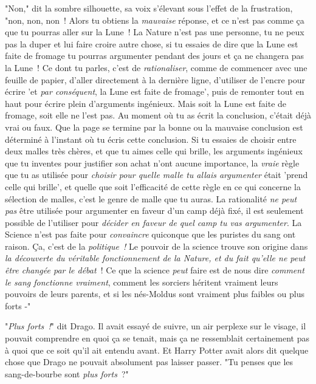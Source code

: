 "Non," dit la sombre silhouette, sa voix s'élevant sous l'effet de la frustration, "non, non, non~! Alors tu obtiens la \emph{mauvaise} réponse, et ce n'est pas comme ça que tu pourras aller sur la Lune~! La Nature n'est pas une personne, tu ne peux pas la duper et lui faire croire autre chose, si tu essaies de dire que la Lune est faite de fromage tu pourras argumenter pendant des jours et ça ne changera pas la Lune~! Ce dont tu parles, c'est de \emph{rationaliser}, comme de commencer avec une feuille de papier, d'aller directement à la dernière ligne, d'utiliser de l'encre pour écrire 'et \emph{par conséquent}, la Lune est faite de fromage', puis de remonter tout en haut pour écrire plein d'arguments ingénieux. Mais soit la Lune est faite de fromage, soit elle ne l'est pas. Au moment où tu as écrit la conclusion, c'était déjà vrai ou faux. Que la page se termine par la bonne ou la mauvaise conclusion est déterminé à l'instant où tu écris cette conclusion. Si tu essaies de choisir entre deux malles très chères, et que tu aimes celle qui brille, les arguments ingénieux que tu inventes pour justifier son achat n'ont aucune importance, la \emph{vraie} règle que tu as utilisée pour \emph{choisir pour quelle malle tu allais argumenter} était 'prend celle qui brille', et quelle que soit l'efficacité de cette règle en ce qui concerne la sélection de malles, c'est le genre de malle que tu auras. La rationalité \emph{ne peut pas} être utilisée pour argumenter en faveur d'un camp déjà fixé, il est seulement possible de l'utiliser pour \emph{décider en faveur de quel camp tu vas argumenter}. La Science n'est pas faite pour \emph{convaincre} quiconque que les puristes du sang ont raison. Ça, c'est de la \emph{politique~!} Le pouvoir de la science trouve son origine dans \emph{la découverte du véritable fonctionnement de la Nature, et du fait qu'elle ne peut être changée par le débat}~! Ce que la science \emph{peut} faire est de nous dire \emph{comment le sang fonctionne vraiment}, comment les sorciers héritent vraiment leurs pouvoirs de leurs parents, et si les nés-Moldus sont vraiment plus faibles ou plus forts -"

"\emph{Plus forts~!}" dit Drago. Il avait essayé de suivre, un air perplexe sur le visage, il pouvait comprendre en quoi ça se tenait, mais ça ne ressemblait certainement pas à quoi que ce soit qu'il ait entendu avant. Et Harry Potter avait alors dit quelque chose que Drago ne pouvait absolument pas laisser passer. "Tu penses que les sang-de-bourbe sont \emph{plus forts}~?"

